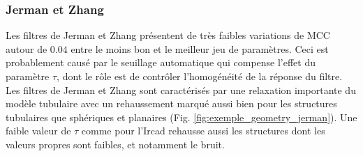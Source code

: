 \subsubsection{Jerman et Zhang}
Les filtres de Jerman et Zhang présentent de très faibles variations de MCC autour de $0.04$ entre le moins bon et le meilleur jeu de paramètres. Ceci est probablement causé par le seuillage automatique qui compense l'effet du paramètre $\tau$, dont le rôle est de contrôler l'homogénéité de la réponse du filtre. Les filtres de Jerman et Zhang sont caractérisés par une relaxation importante du modèle tubulaire avec un rehaussement marqué aussi bien pour les structures tubulaires que sphériques et planaires (Fig. \ref{fig:exemple_geometry_jerman}). Une faible valeur de $\tau$ comme pour l'Ircad rehausse aussi les structures dont les valeurs propres sont faibles, et notamment le bruit.
